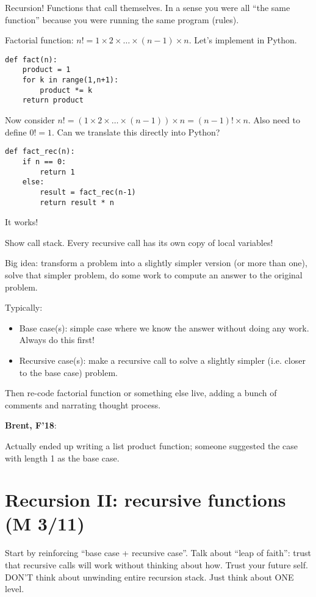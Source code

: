 \documentclass{article}
\newenvironment{reflect}[1]
{
  \noindent
  \begin{lrbox}{\reflectbox}
    \begin{minipage}[t]{\textwidth}
      \textbf{#1}:
}{
    \end{minipage}
  \end{lrbox}
  \fbox{\usebox{\reflectbox}}
}
\newcommand{\ready}{\textcolor{Green}{\Checkmark}\xspace}
\begin{document}
Recursion!  Functions that call themselves.  In a sense you were all
``the same function'' because you were running the same program
(rules).

Factorial function: $n! = 1 \times 2 \times \dots \times (n-1) \times
n$.  Let's implement in Python.
\begin{verbatim}
def fact(n):
    product = 1
    for k in range(1,n+1):
        product *= k
    return product
\end{verbatim}
Now consider $n! = (1 \times 2 \times \dots \times (n-1)) \times n =
(n-1)! \times n$.  Also need to define $0! = 1$.  Can we translate
this directly into Python?
\begin{verbatim}
def fact_rec(n):
    if n == 0:
        return 1
    else:
        result = fact_rec(n-1)
        return result * n
\end{verbatim}
It works!

Show call stack.  Every recursive call has its own copy of local
variables!

Big idea: transform a problem into a slightly simpler version (or more
than one), solve that simpler problem, do some work to compute an
answer to the original problem.

Typically:
\begin{itemize}
\item Base case(s): simple case where we know the answer without doing
  any work.  Always do this first!
\item Recursive case(s): make a recursive call to solve a slightly
  simpler (i.e. closer to the base case) problem.
\end{itemize}

Then re-code factorial function or something else live, adding a bunch
of comments and narrating thought process.

\begin{reflect}{Brent, F'18}
  Actually ended up writing a list product function; someone suggested
  the case with length 1 as the base case.
\end{reflect}

\newpage
\section{\ready Recursion II: recursive functions (M 3/11)}

Start by reinforcing ``base case + recursive case''.  Talk about
``leap of faith'': trust that recursive calls will work without
thinking about how.  Trust your future self.  DON'T think about
unwinding entire recursion stack.  Just think about ONE level.
\end{document}
